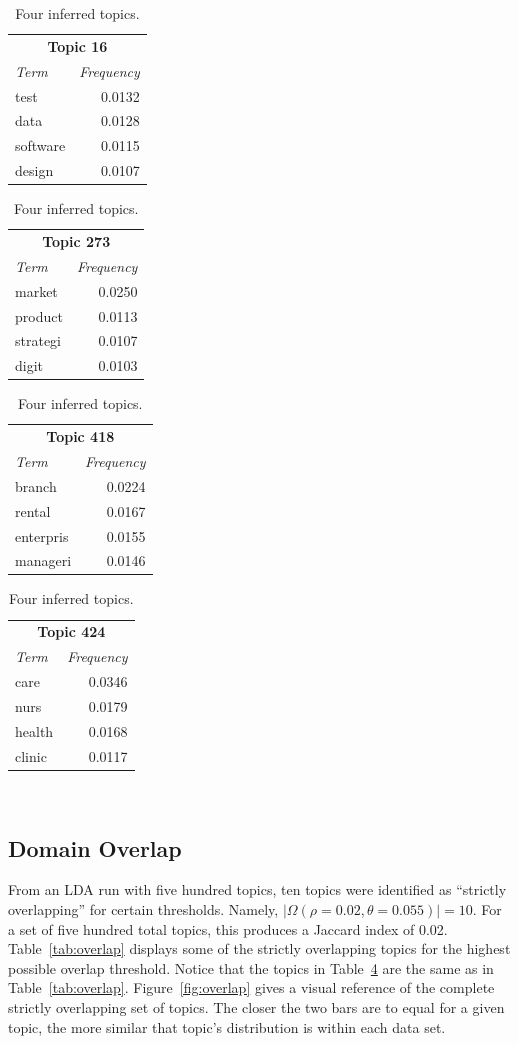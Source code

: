 \begin{table}
  \centering
  \begin{tabular}{l r}
    \multicolumn{2}{c}{\small{\textbf{Topic 16}}} \\
    {\small\textit{Term}} & {\small\textit{Frequency}} \\
    \hline
    test & 0.0132 \\
    data & 0.0128 \\
    software & 0.0115 \\
    design & 0.0107
  \end{tabular}
  \begin{tabular}{l r}
    \multicolumn{2}{c}{\small{\textbf{Topic 273}}} \\
    {\small\textit{Term}} & {\small\textit{Frequency}} \\
    \hline
    market & 0.0250 \\
    product & 0.0113 \\
    strategi & 0.0107 \\
    digit & 0.0103
  \end{tabular}
  \begin{tabular}{l r}
    \multicolumn{2}{c}{\small{\textbf{Topic 418}}} \\
    {\small\textit{Term}} & {\small\textit{Frequency}} \\
    \hline
    branch & 0.0224 \\
    rental & 0.0167 \\
    enterpris & 0.0155 \\
    manageri & 0.0146
  \end{tabular}
  \begin{tabular}{l r}
    \multicolumn{2}{c}{\small{\textbf{Topic 424}}} \\
    {\small\textit{Term}} & {\small\textit{Frequency}} \\
    \hline
    care & 0.0346 \\
    nurs & 0.0179 \\
    health & 0.0168 \\
    clinic & 0.0117
  \end{tabular}
  \caption{Four inferred topics.}~\label{tab:topics}
\end{table}

\subsection{Domain Overlap}

From an LDA run with five hundred topics, ten topics were identified as ``strictly overlapping'' for certain thresholds.
Namely, $|\Omega(\rho=0.02, \theta=0.055)| = 10$.
For a set of five hundred total topics, this produces a Jaccard index of 0.02.
Table~\ref{tab:overlap} displays some of the strictly overlapping topics for the highest possible overlap threshold.
Notice that the topics in Table~\ref{tab:topics} are the same as in Table~\ref{tab:overlap}.
Figure~\ref{fig:overlap} gives a visual reference of the complete strictly overlapping set of topics.
The closer the two bars are to equal for a given topic, the more similar that topic's distribution is within each data set.


